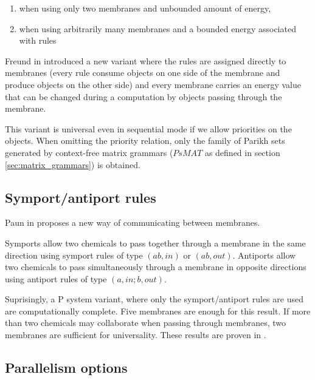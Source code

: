 \begin{enumerate}
	\item when using only two membranes and unbounded amount of energy,
	\item when using arbitrarily many membranes and a bounded energy associated with rules
\end{enumerate}

Freund in \cite{Freund:2004:SequentialEnergy} introduced a new variant where the rules are assigned directly to membranes (every rule consume objects on one side of the membrane and produce objects on the other side) and every membrane carries an energy value that can be changed during a computation by objects passing through the membrane.

This variant is universal even in sequential mode if we allow priorities on the objects. When omitting the priority relation, only the family of Parikh sets generated by context-free matrix grammars ($PsMAT$ as defined in section \ref{sec:matrix_grammars}) is obtained.


\subsection{Symport/antiport rules} %
\label{sub:symport_antiport_rules}

Paun in \cite{Paun:2002:SymportAntiport} proposes a new way of communicating between membranes.

Symports allow two chemicals to pass together through a membrane in the same direction using symport rules of type $(ab,in)$ or $(ab,out)$.
Antiports allow two chemicals to pass simultaneously through a membrane in opposite directions using antiport rules of type $(a,in;b,out)$.

Suprisingly, a P system variant, where only the symport/antiport rules are used are computationally complete. Five membranes are enough for this result. If more than two chemicals may collaborate when passing through membranes, two membranes are sufficient for universality. These results are proven in \cite{Paun:2002:SymportAntiport}.


\subsection{Parallelism options} %
\label{sub:parallelism_options}

